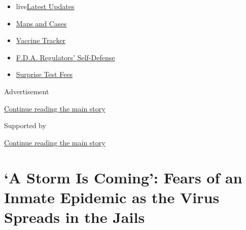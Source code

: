 \begin{itemize}
\tightlist
\item
  live\href{https://www.nytimes3xbfgragh.onion/2020/09/11/world/covid-19-coronavirus.html?name=styln-coronavirus-national\&region=TOP_BANNER\&block=storyline_menu_recirc\&action=click\&pgtype=Article\&impression_id=f12a3131-f4ba-11ea-b616-c3ae477f9ed6\&variant=undefined}{Latest
  Updates}
\item
  \href{https://www.nytimes3xbfgragh.onion/interactive/2020/us/coronavirus-us-cases.html?name=styln-coronavirus-national\&region=TOP_BANNER\&block=storyline_menu_recirc\&action=click\&pgtype=Article\&impression_id=f12a3132-f4ba-11ea-b616-c3ae477f9ed6\&variant=undefined}{Maps
  and Cases}
\item
  \href{https://www.nytimes3xbfgragh.onion/interactive/2020/science/coronavirus-vaccine-tracker.html?name=styln-coronavirus-national\&region=TOP_BANNER\&block=storyline_menu_recirc\&action=click\&pgtype=Article\&impression_id=f12a3133-f4ba-11ea-b616-c3ae477f9ed6\&variant=undefined}{Vaccine
  Tracker}
\item
  \href{https://www.nytimes3xbfgragh.onion/2020/09/10/us/politics/fda-coronavirus-vaccine.html?name=styln-coronavirus-national\&region=TOP_BANNER\&block=storyline_menu_recirc\&action=click\&pgtype=Article\&impression_id=f12a3134-f4ba-11ea-b616-c3ae477f9ed6\&variant=undefined}{F.D.A.
  Regulators' Self-Defense}
\item
  \href{https://www.nytimes3xbfgragh.onion/2020/09/09/upshot/coronavirus-surprise-test-fees.html?name=styln-coronavirus-national\&region=TOP_BANNER\&block=storyline_menu_recirc\&action=click\&pgtype=Article\&impression_id=f12a3135-f4ba-11ea-b616-c3ae477f9ed6\&variant=undefined}{Surprise
  Test Fees}
\end{itemize}

Advertisement

\protect\hyperlink{after-top}{Continue reading the main story}

Supported by

\protect\hyperlink{after-sponsor}{Continue reading the main story}

\hypertarget{a-storm-is-coming-fears-of-an-inmate-epidemic-as-the-virus-spreads-in-the-jails}{%
\section{`A Storm Is Coming': Fears of an Inmate Epidemic as the Virus
Spreads in the
Jails}\label{a-storm-is-coming-fears-of-an-inmate-epidemic-as-the-virus-spreads-in-the-jails}}

